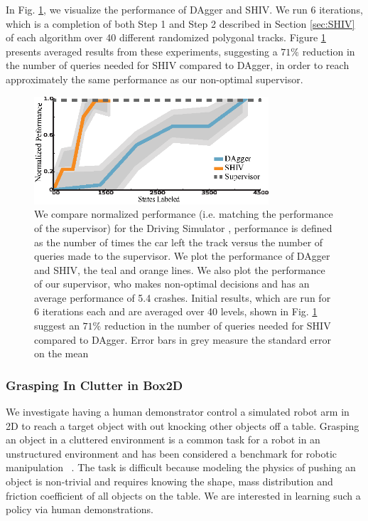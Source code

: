 \documentclass[10pt, conference]{ieeeconf}      %
\begin{document}
In Fig. \ref{fig:car_cost}, we visualize the performance of DAgger and SHIV.  We run 6 iterations, which is a completion of both Step 1 and Step 2 described in Section \ref{sec:SHIV} of each algorithm over 40 different
randomized polygonal tracks. Figure \ref{fig:car_cost} presents averaged
results from these experiments, suggesting a $71\%$ reduction in the number of queries needed for SHIV compared to DAgger, in order to reach approximately the same performance as our non-optimal supervisor.
 
\begin{figure}[t!]
\centering
\includegraphics[width=\columnwidth, height=4cm]{figures/dagger_shiv_one_class.eps}
\caption{ \footnotesize We compare normalized performance (i.e. matching the performance of the supervisor) for the Driving Simulator , performance is defined as the number of times the car left the track versus the number of queries made to the supervisor. We plot the performance of DAgger and SHIV, the teal and orange lines. We also plot the performance of our supervisor, who makes non-optimal decisions and has an average performance of 5.4 crashes. Initial results, which are run for 6 iterations each and are averaged over 40 levels, shown in Fig. \ref{fig:car_cost} suggest an $71\%$ reduction in the number of queries needed for SHIV compared to DAgger. Error bars in grey measure the standard error on the mean}
\vspace*{-20pt}
\label{fig:car_cost}
\end{figure}


\subsubsection{Grasping In Clutter in Box2D}

We investigate having a human demonstrator control a simulated robot arm in 2D to reach a target object with out knocking other objects off a table. Grasping an object in a cluttered environment is a common task for a robot in an unstructured environment and has been considered a benchmark for robotic manipulation~ \cite{kitaevphysics,kingnonprehensile}. The task is difficult because modeling the physics of pushing an object is non-trivial and requires knowing the shape, mass distribution and friction coefficient of all objects on the table. We are interested in learning such a policy via human demonstrations. 
\end{document}
